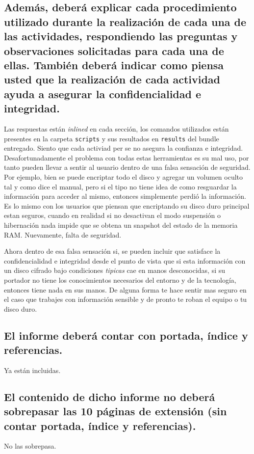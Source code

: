 \documentclass[11pt]{utalcaDoc}
\begin{document}
\subsection{Además, deberá explicar cada procedimiento utilizado durante la realización de cada una de las actividades, respondiendo las preguntas y observaciones solicitadas para cada una de ellas. También deberá indicar como piensa usted que la realización de cada actividad ayuda a asegurar la confidencialidad e integridad.}

Las respuestas están \textit{inlined} en cada sección, los comandos utilizados están presentes en la carpeta \texttt{scripts} y sus resultados en \texttt{results} del bundle entregado. Siento que cada activiad per se no asegura la confianza e integridad. Desafortunadamente el problema con todas estas herramientas es su mal uso, por tanto pueden llevar a sentir al usuario dentro de una falsa sensación de seguridad. Por ejemplo, bien se puede encriptar todo el disco y agregar un volumen oculto tal y como dice el manual, pero si el tipo no tiene idea de como resguardar la información para acceder al mismo, entonces simplemente perdió la información. Es lo mismo con los usuarios que piensan que encriptando su disco duro principal estan seguros, cuando en realidad si no desactivan el modo suspensión o hibernación nada impide que se obtena un snapshot del estado de la memoria RAM. Nuevamente, falta de seguridad.

Ahora dentro de esa falsa sensación si, se pueden incluir que satisface la confidencialidad e integridad desde el punto de vista que si esta información con un disco cifrado bajo condiciones \textit{tipicas} cae en manos desconocidas, si su portador no tiene los conocimientos necesarios del entorno y de la tecnología, entonces tiene nada en sus manos. De alguna forma te hace sentir mas seguro en el caso que trabajes con información sensible y de pronto te roban el equipo o tu disco duro.

\subsection{El informe deberá contar con portada, índice y referencias.}
Ya están incluidas.

\subsection{El contenido de dicho informe no deberá sobrepasar las 10 páginas de extensión (sin contar portada, índice y referencias).}
No las sobrepasa.
\end{document}
